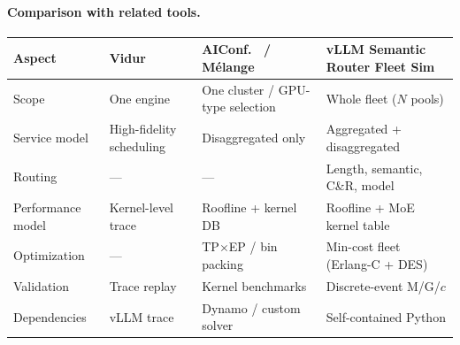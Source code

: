 \documentclass[11pt,a4paper]{article}
\begin{document}
\paragraph{Comparison with related tools.}

\begin{center}
\begin{tabular}{lp{2.8cm}p{2.8cm}p{2.8cm}}
\toprule
Aspect & Vidur~\citep{vidur2024} & AIConf.~\citep{xu2025aiconfigurator} /
  M\'{e}lange~\citep{griggs2024melange} & vLLM Semantic Router Fleet Sim \\
\midrule
Scope
  & One engine
  & One cluster / GPU-type selection
  & Whole fleet ($N$ pools) \\
Service model
  & High-fidelity scheduling
  & Disaggregated only
  & Aggregated + disaggregated \\
Routing
  & ---
  & ---
  & Length, semantic, C\&R, model \\
Performance model
  & Kernel-level trace
  & Roofline + kernel DB
  & Roofline + MoE kernel table \\
Optimization
  & ---
  & TP$\times$EP / bin packing
  & Min-cost fleet (Erlang-C + DES) \\
Validation
  & Trace replay
  & Kernel benchmarks
  & Discrete-event M/G/$c$ \\
Dependencies
  & vLLM trace
  & Dynamo / custom solver
  & Self-contained Python \\
\bottomrule
\end{tabular}
\end{center}



\end{document}
